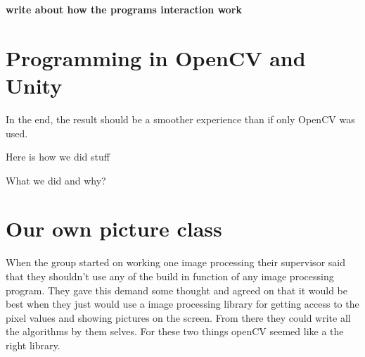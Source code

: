 \textbf{write about how the programs interaction work}
\section{Programming in OpenCV and Unity}

In the end, the result should be a smoother experience than if only OpenCV was used.

Here is how we did stuff

What we did and why?

\section{Our own picture class}
When the group started on working one image processing their supervisor said that they shouldn't use any of the build in function of any image processing program. They gave this demand some thought and agreed on that it would be best when they just would use a image processing library for getting access to the pixel values and showing pictures on the screen. From there they could write all the algorithms by them selves. For these two things openCV seemed like a the right library.
